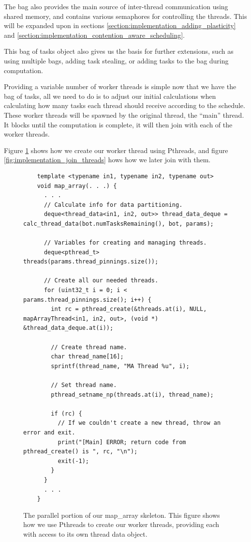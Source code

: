 The bag also provides the main source of inter-thread communication using shared memory, and contains various semaphores for controlling the threads. This will be expanded upon in sections \ref{section:implementation_adding_plasticity} and \ref{section:implementation_contention_aware_scheduling}.

This bag of tasks object also gives us the basis for further extensions, such as using multiple bags, adding task stealing, or adding tasks to the bag during computation.

Providing a variable number of worker threads is simple now that we have the bag of tasks, all we need to do is to adjust our initial calculations when calculating how many tasks each thread should receive according to the schedule. These worker threads will be spawned by the original thread, the ``main'' thread. It blocks until the computation is complete, it will then join with each of the worker threads.

Figure \ref{fig:implementation_create_threads} shows how we create our worker thread using Pthreads, and figure \ref{fig:implementation_join_threads} hows how we later join with them.



\begin{figure}
	\begin{lstlisting}
	template <typename in1, typename in2, typename out>
	void map_array(. . .) {
	  . . .
	  // Calculate info for data partitioning.
	  deque<thread_data<in1, in2, out>> thread_data_deque = calc_thread_data(bot.numTasksRemaining(), bot, params);
  
	  // Variables for creating and managing threads.
	  deque<pthread_t> threads(params.thread_pinnings.size());
  
	  // Create all our needed threads.
	  for (uint32_t i = 0; i < params.thread_pinnings.size(); i++) {
	    int rc = pthread_create(&threads.at(i), NULL, mapArrayThread<in1, in2, out>, (void *) &thread_data_deque.at(i));
  
	    // Create thread name.
	    char thread_name[16];
	    sprintf(thread_name, "MA Thread %u", i);
  
	    // Set thread name.
	    pthread_setname_np(threads.at(i), thread_name);
  
	    if (rc) {
	      // If we couldn't create a new thread, throw an error and exit.
	      print("[Main] ERROR; return code from pthread_create() is ", rc, "\n");
	      exit(-1);
	    }
	  }
	  . . .
	}
	\end{lstlisting}

	\caption{The parallel portion of our map\_array skeleton. This figure shows how we use Pthreads to create our worker threads, providing each with access to its own thread data object.}
	\label{fig:implementation_create_threads}
\end{figure}



